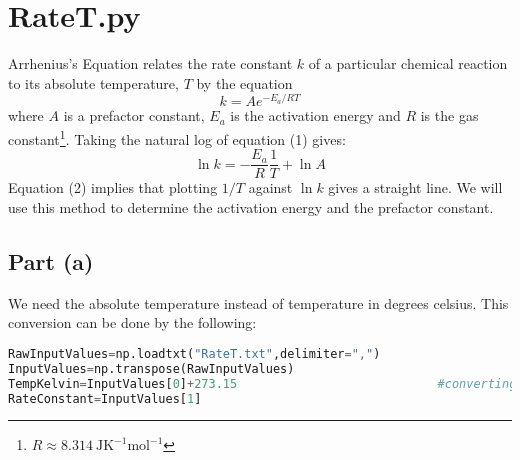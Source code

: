 \documentclass[11pt, oneside]{article}
\begin{document}
\section{RateT.py}
Arrhenius's Equation relates the rate constant $k$ of a particular chemical reaction to its absolute temperature, $T$ by the equation
\begin{equation}
k=Ae^{-E_a/RT}
\end{equation}
where $A$ is a prefactor constant, $E_a$ is the activation energy and $R$ is the gas constant\footnote{$R\approx 8.314\ \text{J}\text{K}^{-1}\text{mol}^{-1}$}. Taking the natural log of equation (1) gives:
\begin{equation}
\ln{k}=-\dfrac{E_a}{R}\dfrac{1}{T}+\ln{A}
\end{equation}
Equation (2) implies that plotting $1/T$ against $\ln{k}$ gives a straight line. We will use this method to determine the activation energy and the prefactor constant. 
\subsection{Part (a)}
We need the absolute temperature instead of temperature in degrees celsius. This conversion can be done by the following: 
\begin{lstlisting}[language=Python, caption=Establishing our data points from RateT.txt]
RawInputValues=np.loadtxt("RateT.txt",delimiter=",")
InputValues=np.transpose(RawInputValues)
TempKelvin=InputValues[0]+273.15							#converting from Celsius to Kelvin
RateConstant=InputValues[1]			
\end{lstlisting}
\end{document}
